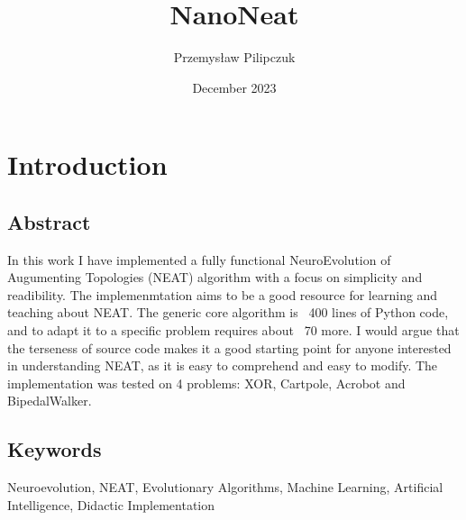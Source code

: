 \documentclass{article}
\title{NanoNeat}
\author{Przemysław Pilipczuk}
\date{December 2023}
\begin{document}
\maketitle

\tableofcontents
\section{Introduction}
\subsection{Abstract}
In this work I have implemented a fully functional  NeuroEvolution of Augumenting Topologies (NEAT) algorithm 
with a focus on simplicity and readibility. The implemenmtation aims to be a good resource for learning and teaching about NEAT.
The generic core algorithm is ~400 lines of Python code, and to adapt it to a specific problem requires about ~70 
more. I would argue that the terseness of source code makes it a good starting point for anyone interested in understanding NEAT, 
as it is easy to comprehend and easy to modify.
The implementation was tested on 4 problems: XOR, Cartpole, Acrobot and BipedalWalker. 

\subsection{Keywords}
Neuroevolution, NEAT, Evolutionary Algorithms, Machine Learning, Artificial Intelligence, Didactic Implementation
\end{document}
